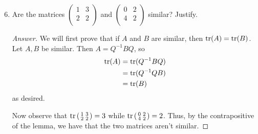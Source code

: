 \documentclass[../psets.tex]{subfiles}
\begin{document}
\begin{enumerate}[label={\textbf{8.\arabic*.}}]
    \setcounter{enumi}{5}
    \item Are the matrices $
        \left(
        \begin{smallmatrix}
            1 & 3\\
            2 & 2\\
        \end{smallmatrix}
        \right)
    $ and $
        \left(
        \begin{smallmatrix}
            0 & 2\\
            4 & 2\\
        \end{smallmatrix}
        \right)
    $ similar? Justify.
    \begin{proof}[Answer]
        We will first prove that if $A$ and $B$ are similar, then $\trace(A)=\trace(B)$. Let $A,B$ be similar. Then $A=Q^{-1}BQ$, so
        \begin{align*}
            \trace(A) &= \trace(Q^{-1}BQ)\\
            &= \trace(Q^{-1}QB)\\
            &= \trace(B)
        \end{align*}
        as desired.\par
        Now observe that $
            \trace\left(
                \begin{smallmatrix}
                    1 & 3\\
                    2 & 2\\
                \end{smallmatrix}
            \right)=3
        $ while $
            \trace\left(
                \begin{smallmatrix}
                    0 & 2\\
                    4 & 2\\
                \end{smallmatrix}
            \right)=2
        $. Thus, by the contrapositive of the lemma, we have that the two matrices aren't similar.
    \end{proof}
\end{enumerate}
\end{document}
